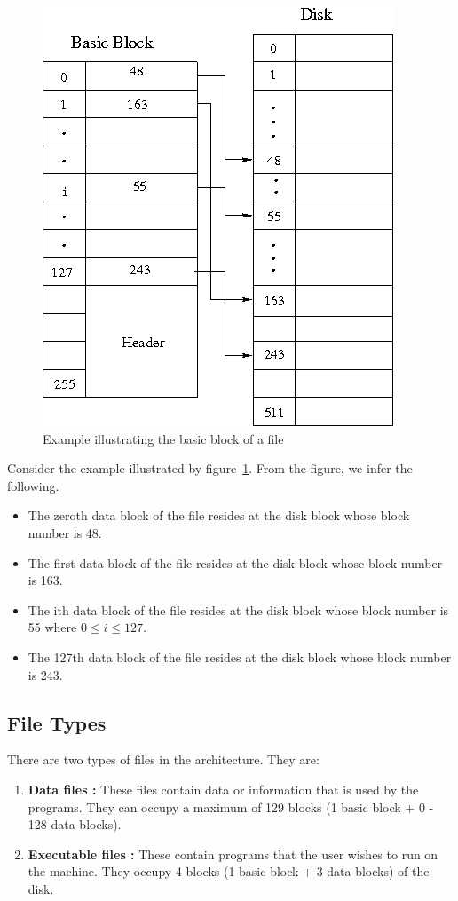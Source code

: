 \begin{example}
	\begin{figure}[h!]
	\centering
	\includegraphics[scale=0.60]{pics/basic_block_example}
	\caption{Example illustrating the basic block of a file}
	\label{basic block example}
	\end{figure}

	Consider the example illustrated by figure~\ref{basic block example}.
	From the figure, we infer the following. 
	\begin{itemize}
		\item  The zeroth data block of the file resides at the disk block whose block number is 48. 
		\item  The first data block of the file resides at the disk block whose block number is 163.
		\item  The ith data block of the file resides at the disk block whose block number is 55 where $ 0\le i \le 127$. 
		\item  The 127th data block of the file resides at the disk block whose block number is 243.
	\end{itemize}
\end{example}

\subsection{File Types} 
There are two types of files in the \ESIM architecture. They are:
\begin{enumerate}
	\item \textbf{Data files :} These files contain data or information that is used by the programs. They can occupy a maximum of 129 blocks (1 basic block + 0 - 128 data blocks).
	\item \textbf{Executable files :} These contain programs that the user wishes to run on the machine. They occupy 4 blocks (1 basic block + 3 data blocks) of the disk.
\end{enumerate}


